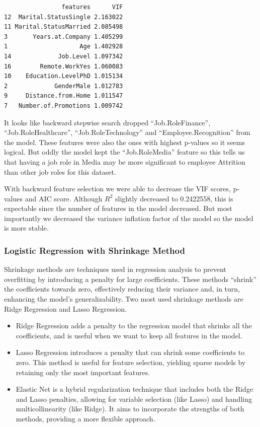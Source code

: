 \documentclass[
  10pt,
  paper=a4,
  ,captions=tableheading
]{scrartcl}
\begin{document}
\begin{verbatim}
                features      VIF
12  Marital.StatusSingle 2.163022
11 Marital.StatusMarried 2.085498
3       Years.at.Company 1.405299
1                    Age 1.402928
14             Job.Level 1.097342
16        Remote.WorkYes 1.060083
10    Education.LevelPhD 1.015134
2             GenderMale 1.012783
9     Distance.from.Home 1.011547
7   Number.of.Promotions 1.009742
\end{verbatim}

\small

It looks like backward stepwise search dropped ``Job.RoleFinance'',
``Job.RoleHealthcare'', ``Job.RoleTechnology'' and
``Employee.Recognition'' from the model. These features were also the
ones with highest p-values so it seems logical. But oddly the model kept
the ``Job.RoleMedia'' feature so this tells us that having a job role in
Media may be more significant to employee Attrition than other job roles
for this dataset.

With backward feature selection we were able to decrease the VIF scores,
p-values and AIC score. Although \(R^2\) slightly decreased to
0.2422558, this is expectable since the number of features in the model
decreased. But most importantly we decreased the variance inflation
factor of the model so the model is more stable.

\subsubsection{Logistic Regression with Shrinkage
Method}\label{logistic-regression-with-shrinkage-method}

Shrinkage methods are techniques used in regression analysis to prevent
overfitting by introducing a penalty for large coefficients. These
methods ``shrink'' the coefficients towards zero, effectively reducing
their variance and, in turn, enhancing the model's generalizability. Two
most used shrinkage methods are Ridge Regression and Lasso Regression.

\begin{itemize}
\item
  Ridge Regression adds a penalty to the regression model that shrinks
  all the coefficients, and is useful when we want to keep all features
  in the model.
\item
  Lasso Regression introduces a penalty that can shrink some
  coefficients to zero. This method is useful for feature selection,
  yielding sparse models by retaining only the most important features.
\item
  Elastic Net is a hybrid regularization technique that includes both
  the Ridge and Lasso penalties, allowing for variable selection (like
  Lasso) and handling multicollinearity (like Ridge). It aims to
  incorporate the strengths of both methods, providing a more flexible
  approach.
\end{itemize}
\end{document}
